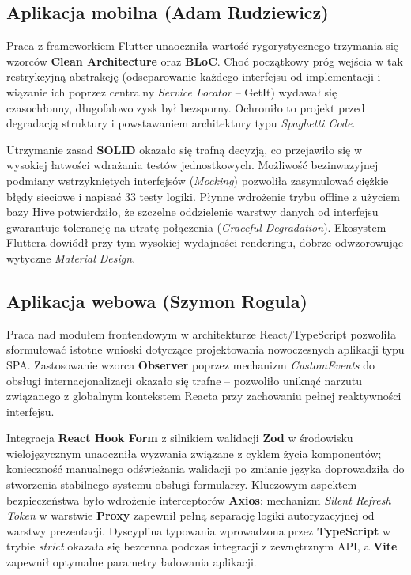 \documentclass[12pt,a4paper]{article}
\begin{document}
\subsection{Aplikacja mobilna (Adam Rudziewicz)}

Praca z frameworkiem Flutter unaoczni\l{}a warto\'s\'c rygorystycznego trzymania si\k{e} wzorc\'ow \textbf{Clean Architecture} oraz \textbf{BLoC}. Cho\'c pocz\k{a}tkowy pr\'og wej\'scia w tak restrykcyjn\k{a} abstrakcj\k{e} (odseparowanie ka\.zdego interfejsu od implementacji i wi\k{a}zanie ich poprzez centralny \textit{Service Locator} -- GetIt) wydawa\l{} si\k{e} czasoch\l{}onny, d\l{}ugofalowo zysk by\l{} bezsporny. Ochroni\l{}o to projekt przed degradacj\k{a} struktury i powstawaniem architektury typu \textit{Spaghetti Code}.

Utrzymanie zasad \textbf{SOLID} okaza\l{}o si\k{e} trafn\k{a} decyzj\k{a}, co przejawi\l{}o si\k{e} w wysokiej \l{}atwo\'sci wdra\.zania test\'ow jednostkowych. Mo\.zliwo\'s\'c bezinwazyjnej podmiany wstrzykni\k{e}tych interfejs\'ow (\textit{Mocking}) pozwoli\l{}a zasymulowa\'c ci\k{e}\.zkie b\l{}\k{e}dy sieciowe i napisa\'c 33 testy logiki. P\l{}ynne wdro\.zenie trybu offline z u\.zyciem bazy Hive potwierdzi\l{}o, \.ze szczelne oddzielenie warstwy danych od interfejsu gwarantuje tolerancj\k{e} na utrat\k{e} po\l{}\k{a}czenia (\textit{Graceful Degradation}). Ekosystem Fluttera dowi\'od\l{} przy tym wysokiej wydajno\'sci renderingu, dobrze odwzorowuj\k{a}c wytyczne \textit{Material Design}.

\subsection{Aplikacja webowa (Szymon Rogula)}

Praca nad modu\l{}em frontendowym w architekturze React/TypeScript pozwoli\l{}a sformu\l{}owa\'c istotne wnioski dotycz\k{a}ce projektowania nowoczesnych aplikacji typu SPA. Zastosowanie wzorca \textbf{Observer} poprzez mechanizm \textit{CustomEvents} do obs\l{}ugi internacjonalizacji okaza\l{}o si\k{e} trafne -- pozwoli\l{}o unikn\k{a}\'c narzutu zwi\k{a}zanego z globalnym kontekstem Reacta przy zachowaniu pe\l{}nej reaktywno\'sci interfejsu.

Integracja \textbf{React Hook Form} z silnikiem walidacji \textbf{Zod} w \'srodowisku wieloj\k{e}zycznym unaoczni\l{}a wyzwania zwi\k{a}zane z cyklem \.zycia komponent\'ow; konieczno\'s\'c manualnego od\'swie\.zania walidacji po zmianie j\k{e}zyka doprowadzi\l{}a do stworzenia stabilnego systemu obs\l{}ugi formularzy. Kluczowym aspektem bezpiecze\'nstwa by\l{}o wdro\.zenie interceptor\'ow \textbf{Axios}: mechanizm \textit{Silent Refresh Token} w warstwie \textbf{Proxy} zapewni\l{} pe\l{}n\k{a} separacj\k{e} logiki autoryzacyjnej od warstwy prezentacji. Dyscyplina typowania wprowadzona przez \textbf{TypeScript} w trybie \textit{strict} okaza\l{}a si\k{e} bezcenna podczas integracji z zewn\k{e}trznym API, a \textbf{Vite} zapewni\l{} optymalne parametry \l{}adowania aplikacji.
\end{document}

